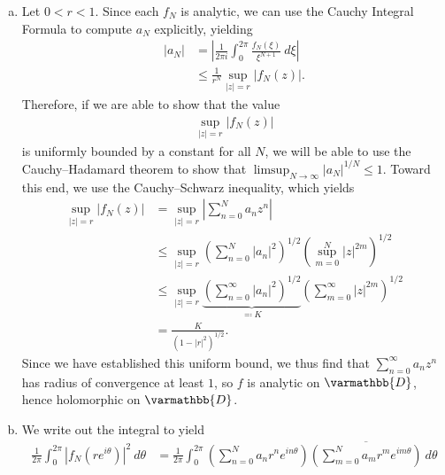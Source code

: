\documentclass[10pt]{mypackage}
\renewcommand*{\mathbb}[1]{\varmathbb{#1}}
\begin{document}
\begin{solution}\hfill
  \begin{enumerate}[(a)]
    \item Let $ 0 < r < 1 $. Since each $f_N$ is analytic, we can use the Cauchy Integral Formula to compute $a_N$ explicitly, yielding
      \begin{align*}
        \left\vert a_N \right\vert &= \left\vert \frac{1}{2\pi i} \int_{0}^{2\pi} \frac{f_N\left( \xi \right)}{\xi^{N+1}}\:d\xi \right\vert\\
                                   &\leq \frac{1}{r^{N}} \sup_{|z| = r} \left\vert f_N\left( z \right) \right\vert.
      \end{align*}
      Therefore, if we are able to show that the value 
      \begin{align*}
        \sup_{|z| = r}\left\vert f_N\left( z \right) \right\vert
      \end{align*}
      is uniformly bounded by a constant for all $N$, we will be able to use the Cauchy--Hadamard theorem to show that $\limsup_{N\rightarrow\infty}\left\vert a_N \right\vert^{1/N}\leq 1$. Toward this end, we use the Cauchy--Schwarz inequality, which yields
      \begin{align*}
        \sup_{|z| = r} \left\vert f_N(z) \right\vert &= \sup_{|z| = r} \left\vert \sum_{n=0}^{N}a_nz^{n} \right\vert\\
                                                     &\leq \sup_{|z| = r} \left( \sum_{n=0}^{N} \left\vert a_n \right\vert^2 \right)^{1/2} \left( \sup_{m=0}^{N} \left\vert z \right\vert^{2m} \right)^{1/2}\\
                                                     &\leq \sup_{|z| = r} \underbrace{\left( \sum_{n=0}^{\infty}\left\vert a_n \right\vert^2 \right)^{1/2}}_{\eqcolon K} \left( \sum_{m=0}^{\infty}\left\vert z \right\vert^{2m} \right)^{1/2}\\
                                                     &= \frac{K}{\left( 1-|r|^2 \right)^{1/2}}.
      \end{align*}
      Since we have established this uniform bound, we thus find that $ \sum_{n=0}^{\infty}a_nz^{n} $ has radius of convergence at least $1$, so $f$ is analytic on $ \mathbb{D} $, hence holomorphic on $ \mathbb{D} $.
    \item We write out the integral to yield
      \begin{align*}
        \frac{1}{2\pi}\int_{0}^{2\pi} \left\vert f_N\left( re^{i\theta} \right) \right\vert^2\:d\theta &= \frac{1}{2\pi} \int_{0}^{2\pi} \left( \sum_{n=0}^{N} a_nr^{n}e^{in\theta} \right) \overline{\left( \sum_{m=0}^{N} a_mr^{m}e^{im\theta} \right)}\:d\theta\\

\end{align*}
\end{enumerate}
\end{solution}
\end{document}
